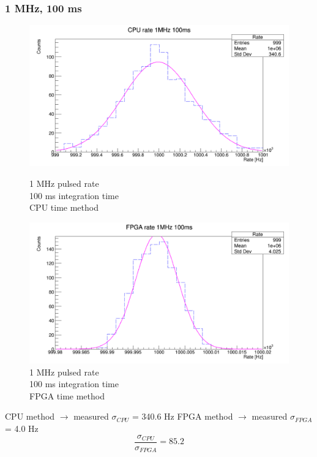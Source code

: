 \subsubsection{1 MHz, 100 ms}
\begin{figure}[H]
	\centering
	\begin{minipage}{0.49\textwidth}
		\centering
		\includegraphics[width=.95\linewidth]{IMG/ch5/RateMeasures/CPU-time-rate-1MHz-100ms}
		\caption{1 MHz pulsed rate\\100 ms integration time\\CPU time method}
		\label{fig:CPU-time-rate-1MHz-100ms}
	\end{minipage}%
	\begin{minipage}{0.49\textwidth}
		\centering
		\includegraphics[width=.95\linewidth]{IMG/ch5/RateMeasures/FPGA-time-rate-1MHz-100ms}
		\caption{1 MHz pulsed rate\\100 ms integration time\\FPGA time method}
		\label{fig:FPGA-time-rate-1MHz-100ms}
	\end{minipage}
\end{figure}
\noindent CPU method $\rightarrow$ measured $\sigma_{CPU}$ = 340.6 Hz
\newline
FPGA method $\rightarrow$ measured $\sigma_{FPGA}$ = 4.0 Hz
\begin{equation}
	\frac{\sigma_{CPU}}{\sigma_{FPGA}} = 85.2
\end{equation}


